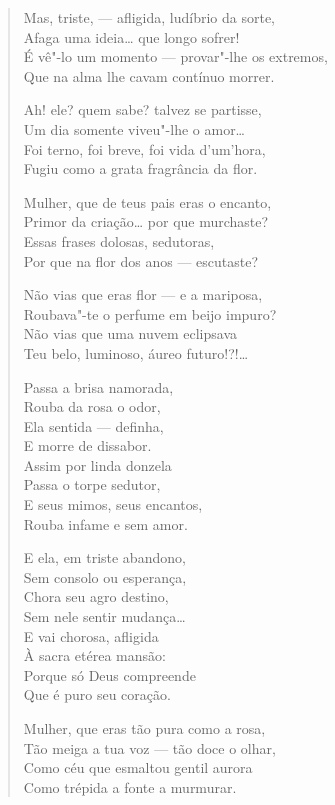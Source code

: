 \begin{verse}
Mas, triste, --- afligida, ludíbrio da sorte,\\
Afaga uma ideia\ldots{} que longo sofrer!\\
É vê"-lo um momento --- provar"-lhe os extremos,\\
Que na alma lhe cavam contínuo morrer.

Ah! ele? quem sabe? talvez se partisse,\\
Um dia somente viveu"-lhe o amor\ldots{}\\
Foi terno, foi breve, foi vida d'um'hora,\\
Fugiu como a grata fragrância da flor.

Mulher, que de teus pais eras o encanto,\\
Primor da criação\ldots{} por que murchaste?\\
Essas frases dolosas, sedutoras,\\
Por que na flor dos anos --- escutaste?

Não vias que eras flor --- e a mariposa,\\
Roubava"-te o perfume em beijo impuro?\\
Não vias que uma nuvem eclipsava\\
Teu belo, luminoso, áureo futuro!?!\ldots{}

Passa a brisa namorada,\\
Rouba da rosa o odor,\\
Ela sentida --- definha,\\
E morre de dissabor.\\
Assim por linda donzela\\
Passa o torpe sedutor,\\
E seus mimos, seus encantos,\\
Rouba infame e sem amor.

E ela, em triste abandono,\\
Sem consolo ou esperança,\\
Chora seu agro destino,\\
Sem nele sentir mudança\ldots{}\\
E vai chorosa, afligida\\
À sacra etérea mansão:\\
Porque só Deus compreende\\
Que é puro seu coração.

Mulher, que eras tão pura como a rosa,\\
Tão meiga a tua voz --- tão doce o olhar,\\
Como céu que esmaltou gentil aurora\\
Como trépida a fonte a murmurar.


\end{verse}
